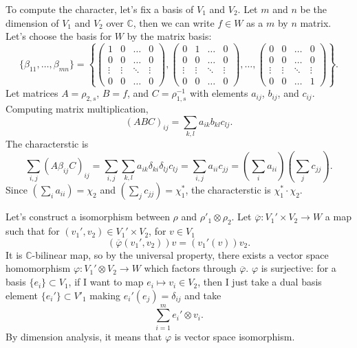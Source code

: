 \documentclass[a4paper, 12pt]{article}
\theoremstyle{Mydefinition}
\theoremstyle{Mytheorem}
\begin{document}
To compute the character, let's fix a basis of $V_1$ and $V_2$. Let $m$ and $n$ be the dimension of $V_1$ and $V_2$ over $\mathbb{C}$, then we can write $f\in W$ as a $m$ by $n$ matrix. Let's choose the basis for $W$ by the matrix basis:
\begin{equation}
    \{\beta_{11}, \ldots, \beta_{mn}\} = \left\{\begin{pmatrix}1 & 0 & \hdots & 0\\
    0 & 0 & \hdots & 0\\
    \vdots & \vdots & \ddots & \vdots\\
    0 & 0 & \hdots & 0
    \end{pmatrix}, \begin{pmatrix}0 & 1 & \hdots & 0\\
    0 & 0 & \hdots & 0\\
    \vdots & \vdots & \ddots & \vdots\\
    0 & 0 & \hdots & 0
    \end{pmatrix}, \ldots, \begin{pmatrix}0 & 0 & \hdots & 0\\
    0 & 0 & \hdots & 0\\
    \vdots & \vdots & \ddots & \vdots\\
    0 & 0 & \hdots & 1
    \end{pmatrix}\right\}.
\end{equation}
Let matrices $A = \rho_{2,s}$, $B = f$, and $C = \rho_{1,s}^{-1}$ with elements $a_{ij}$, $b_{ij}$, and $c_{ij}$. Computing matrix multiplication,
\begin{equation}
    (ABC)_{ij} = \sum_{k,l} a_{ik}b_{kl}c_{lj}.
\end{equation}
The characterstic is
\begin{equation}
    \sum_{i,j}(A\beta_{ij}C)_{ij} = \sum_{i,j}\sum_{k,l}a_{ik}\delta_{ki}\delta_{lj}c_{lj} = \sum_{i,j}a_{ii}c_{jj} = \left(\sum_{i}a_{ii}\right)\left(\sum_{j}c_{jj}\right).
\end{equation}
Since $\left(\sum_{i}a_{ii}\right) = \chi_2$ and $\left(\sum_{j}c_{jj}\right) = \chi_1^*$, the characterstic is $\chi_1^*\cdot \chi_2$.

Let's construct a isomorphism between $\rho$ and $\rho'_1\otimes \rho_2$. Let $\overline{\varphi}:V_1'\times V_2\rightarrow W$ a map such that for $(v_1',v_2)\in V_1'\times V_2$, for $v\in V_1$
\begin{equation}
    \left(\overline{\varphi}(v_1',v_2)\right)v = (v_1'(v))v_2.
\end{equation}
It is $\mathbb{C}$-bilinear map, so by the universal property, there exists a vector space homomorphism $\varphi:V_1'\otimes V_2\rightarrow W$ which factors through $\overline{\varphi}$. $\varphi$ is surjective: for a basis $\{e_i\}\subset V_1$, if I want to map $e_i\mapsto v_i\in V_2$, then I just take a dual basis element $\{e_i'\}\subset V'_1$ making $e_i'(e_j) = \delta_{ij}$ and take
\begin{equation}
    \sum_{i=1}^m e_i'\otimes v_i.
\end{equation}
By dimension analysis, it means that $\varphi$ is vector space isomorphism. 
\end{document}
